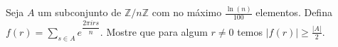 Seja \(A\) um subconjunto de \(\mathbb{Z}/n\mathbb{Z}\) com no máximo \(\frac{\ln(n)}{100}\) elementos. Defina \(f(r)=\sum_{s\in A} e^{\dfrac{2 \pi i r s}{n}}\). Mostre que para algum \(r \ne 0\) temos \(|f(r)| \geq \frac{|A|}{2}\).
